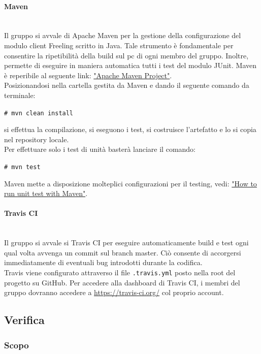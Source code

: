 {\paragraph{Maven}\mbox{}\\
Il gruppo \gruppo  
si avvale di Apache Maven per la gestione della configurazione del modulo client Freeling scritto in Java. Tale strumento è fondamentale per consentire la ripetibilità della build sul pc di ogni membro del gruppo. Inoltre, permette di eseguire in maniera automatica tutti i test del modulo JUnit. Maven è reperibile al seguente link: \href{https://maven.apache.org/}{"Apache Maven Project"}. 
\\
Posizionandosi nella cartella gestita da Maven e dando il seguente comando da terminale: 
\begin{center}
\texttt{\# mvn clean install}
\end{center}
si effettua la compilazione, si eseguono i test, si costruisce l’artefatto e lo si copia nel
repository locale.
\\
Per effettuare solo i test di unità basterà lanciare il comando: 
\begin{center}
\texttt{\# mvn test}
\end{center} 
Maven mette a disposizione molteplici configurazioni per il testing, vedi: 
\href{https://www.mkyong.com/maven/how-to-run-unit-test-with-maven/}{"How to run unit test with Maven"}.

\paragraph{Travis CI}\mbox{}\\
Il gruppo \gruppo \space si avvale si Travis CI per eseguire automaticamente build e test ogni qual volta avvenga un commit sul branch master. Ciò consente di accorgersi immediatamente di eventuali bug introdotti durante la codifica.\\
Travis viene configurato attraverso il file \texttt{.travis.yml} posto nella root del progetto su GitHub. Per accedere alla dashboard di Travis CI, i membri del gruppo dovranno accedere a \url{https://travis-ci.org/} col proprio account.

\subsection{Verifica}

\subsubsection{Scopo}

}
